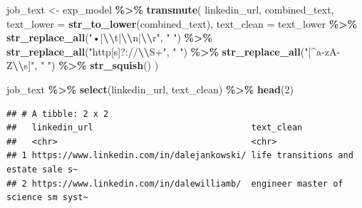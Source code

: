 \documentclass[
]{article}
\newenvironment{Shaded}{\begin{snugshade}}{\end{snugshade}}
\newcommand{\AttributeTok}[1]{\textcolor[rgb]{0.13,0.29,0.53}{#1}}
\newcommand{\DecValTok}[1]{\textcolor[rgb]{0.00,0.00,0.81}{#1}}
\newcommand{\FunctionTok}[1]{\textcolor[rgb]{0.13,0.29,0.53}{\textbf{#1}}}
\newcommand{\NormalTok}[1]{#1}
\newcommand{\OtherTok}[1]{\textcolor[rgb]{0.56,0.35,0.01}{#1}}
\newcommand{\SpecialCharTok}[1]{\textcolor[rgb]{0.81,0.36,0.00}{\textbf{#1}}}
\newcommand{\StringTok}[1]{\textcolor[rgb]{0.31,0.60,0.02}{#1}}
\begin{document}
\begin{Shaded}
\begin{Highlighting}[]
\NormalTok{job\_text }\OtherTok{\textless{}{-}}\NormalTok{ exp\_model }\SpecialCharTok{\%\textgreater{}\%}
  \FunctionTok{transmute}\NormalTok{(}
\NormalTok{    linkedin\_url,}
\NormalTok{    combined\_text,}
    \AttributeTok{text\_lower =} \FunctionTok{str\_to\_lower}\NormalTok{(combined\_text),}
    \AttributeTok{text\_clean =}\NormalTok{ text\_lower }\SpecialCharTok{\%\textgreater{}\%}
      \FunctionTok{str\_replace\_all}\NormalTok{(}\StringTok{"•|}\SpecialCharTok{\textbackslash{}\textbackslash{}}\StringTok{t|}\SpecialCharTok{\textbackslash{}\textbackslash{}}\StringTok{n|}\SpecialCharTok{\textbackslash{}\textbackslash{}}\StringTok{r"}\NormalTok{, }\StringTok{" "}\NormalTok{) }\SpecialCharTok{\%\textgreater{}\%}
      \FunctionTok{str\_replace\_all}\NormalTok{(}\StringTok{"http[s]?://}\SpecialCharTok{\textbackslash{}\textbackslash{}}\StringTok{S+"}\NormalTok{, }\StringTok{" "}\NormalTok{) }\SpecialCharTok{\%\textgreater{}\%}
      \FunctionTok{str\_replace\_all}\NormalTok{(}\StringTok{"[\^{}a{-}zA{-}Z}\SpecialCharTok{\textbackslash{}\textbackslash{}}\StringTok{s]"}\NormalTok{, }\StringTok{" "}\NormalTok{) }\SpecialCharTok{\%\textgreater{}\%}
      \FunctionTok{str\_squish}\NormalTok{()}
\NormalTok{  )}

\NormalTok{job\_text }\SpecialCharTok{\%\textgreater{}\%} \FunctionTok{select}\NormalTok{(linkedin\_url, text\_clean) }\SpecialCharTok{\%\textgreater{}\%} \FunctionTok{head}\NormalTok{(}\DecValTok{2}\NormalTok{)}
\end{Highlighting}
\end{Shaded}

\begin{verbatim}
## # A tibble: 2 x 2
##   linkedin_url                               text_clean                         
##   <chr>                                      <chr>                              
## 1 https://www.linkedin.com/in/dalejankowski/ life transitions and estate sale s~
## 2 https://www.linkedin.com/in/dalewilliamb/  engineer master of science sm syst~
\end{verbatim}
\end{document}
